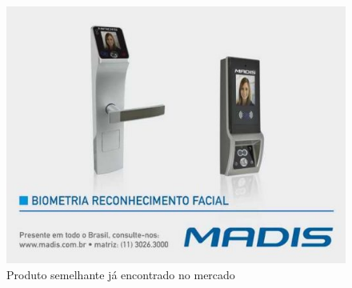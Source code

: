 \documentclass[conference,compsoc]{IEEEtran}
\begin{document}
\begin{figure}[!ht]
		\centering
		\includegraphics[scale=0.25]{exemplo.jpg}
		\caption{Produto semelhante já encontrado no mercado \cite{referencia:8}}
\end{figure}
\end{document}

